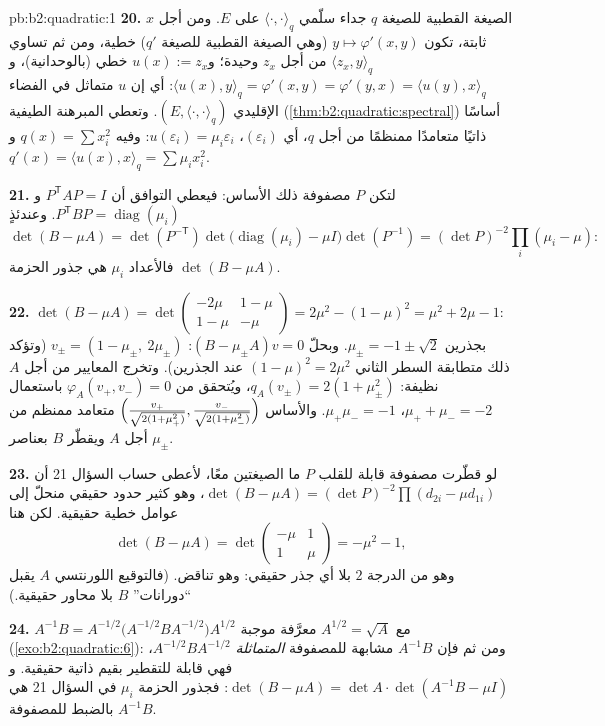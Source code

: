 \begin{solution}{pb:b2:quadratic:1}
\textbf{20.} الصيغة القطبية للصيغة $q$ جداء سلّمي
$\langle\cdot,\cdot\rangle_q$ على $E$. ومن أجل $x$ ثابتة، تكون $y \mapsto
\varphi'(x, y)$ (وهي الصيغة القطبية للصيغة $q'$) خطية، ومن ثم تساوي
$\langle z_x, y\rangle_q$ من أجل $z_x$ وحيدة؛ و$u(x) := z_x$
خطي (بالوحدانية)، و$\langle u(x), y\rangle_q =
\varphi'(x,y) = \varphi'(y,x) = \langle u(y), x\rangle_q$: أي إن $u$
متماثل في الفضاء الإقليدي $(E,
\langle\cdot,\cdot\rangle_q)$. وتعطي المبرهنة الطيفية
(\cref{thm:b2:quadratic:spectral}) أساسًا ذاتيًا متعامدًا ممنظمًا من أجل $q$،
أي $(\varepsilon_i)$، $u(\varepsilon_i) =
\mu_i\varepsilon_i$: وفيه $q(x) = \sum x_i^2$ و$q'(x) =
\langle u(x), x\rangle_q = \sum\mu_ix_i^2$.

\textbf{21.} لتكن $P$ مصفوفة ذلك الأساس: فيعطي التوافق
أن $P^{\mathsf T}AP = I$ و$P^{\mathsf T}BP =
\operatorname{diag}(\mu_i)$. وعندئذٍ
\[
\det(B - \mu A) = \det(P^{-\mathsf T})
\det\bigl(\operatorname{diag}(\mu_i) - \mu I\bigr)
\det(P^{-1})
= (\det P)^{-2}\prod_i(\mu_i - \mu) :
\]
فالأعداد $\mu_i$ هي جذور الحزمة $\det(B - \mu A)$.

\textbf{22.} $\det(B - \mu A) =
\det\begin{pmatrix} -2\mu & 1-\mu\\ 1-\mu & -\mu\end{pmatrix}
= 2\mu^2 - (1-\mu)^2 = \mu^2 + 2\mu - 1$: بجذرين $\mu_\pm = -1
\pm \sqrt2$. وبحلّ $(B - \mu_\pm A)v = 0$: $v_\pm = (1 -
\mu_\pm,\ 2\mu_\pm)$ (وتؤكد ذلك متطابقة السطر الثاني $(1-\mu)^2 =
2\mu^2$ عند الجذرين). وتخرج المعايير من أجل $A$ نظيفة: $q_A(v_\pm) = 2(1 + \mu_\pm^2)$، ويُتحقق من
$\varphi_A(v_+, v_-) = 0$ باستعمال $\mu_+ + \mu_- = -2$،
$\mu_+\mu_- = -1$. والأساس $\Bigl(\frac{v_+}{\sqrt{2(1 +
\mu_+^2)}}, \frac{v_-}{\sqrt{2(1+\mu_-^2)}}\Bigr)$
متعامد ممنظم من أجل $A$ ويقطّر $B$ بعناصر
$\mu_\pm$.

\textbf{23.} لو قطّرت مصفوفة قابلة للقلب $P$ ما الصيغتين معًا،
لأعطى حساب السؤال 21 أن $\det(B - \mu A) = (\det
P)^{-2}\prod(d_{2i} - \mu d_{1i})$، وهو كثير حدود حقيقي منحلّ
إلى عوامل خطية حقيقية. لكن هنا
\[
\det(B - \mu A) = \det\begin{pmatrix} -\mu & 1\\ 1 &
\mu\end{pmatrix} = -\mu^2 - 1 ,
\]
وهو من الدرجة $2$ بلا أي جذر حقيقي: وهو تناقض. (فالتوقيع
اللورنتسي $A$ يقبل ``دورانات'' $B$ بلا محاور
حقيقية.)

\textbf{24.} $A^{-1}B = A^{-1/2}\bigl(A^{-1/2}BA^{-1/2}\bigr)
A^{1/2}$ مع $A^{1/2} = \sqrt A$ معرَّفة موجبة
(\cref{exo:b2:quadratic:6}): ومن ثم فإن $A^{-1}B$ مشابهة للمصفوفة
\emph{المتماثلة} $A^{-1/2}BA^{-1/2}$، فهي قابلة للتقطير بقيم ذاتية
حقيقية. و$\det(B - \mu A) = \det A\cdot
\det(A^{-1}B - \mu I)$: فجذور الحزمة $\mu_i$ في السؤال
21 هي بالضبط  للمصفوفة $A^{-1}B$.


\end{solution}
